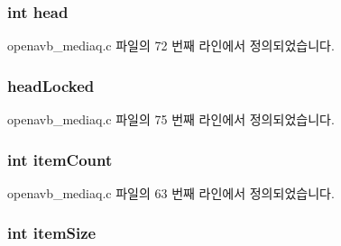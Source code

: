 \subsubsection[{\texorpdfstring{head}{head}}]{\setlength{\rightskip}{0pt plus 5cm}int head}\hypertarget{structmedia__q__info__t_a20358970b1abaf992eb85e071e454653}{}\label{structmedia__q__info__t_a20358970b1abaf992eb85e071e454653}


openavb\+\_\+mediaq.\+c 파일의 72 번째 라인에서 정의되었습니다.

\subsubsection[{\texorpdfstring{head\+Locked}{headLocked}}]{ head\+Locked}\hypertarget{structmedia__q__info__t_a6c67b0583525d5d6c4b9c53a67cd5780}{}\label{structmedia__q__info__t_a6c67b0583525d5d6c4b9c53a67cd5780}


openavb\+\_\+mediaq.\+c 파일의 75 번째 라인에서 정의되었습니다.

\subsubsection[{\texorpdfstring{item\+Count}{itemCount}}]{\setlength{\rightskip}{0pt plus 5cm}int item\+Count}\hypertarget{structmedia__q__info__t_a64154ed2427d248eb1d4aa28aef8daa2}{}\label{structmedia__q__info__t_a64154ed2427d248eb1d4aa28aef8daa2}


openavb\+\_\+mediaq.\+c 파일의 63 번째 라인에서 정의되었습니다.

\subsubsection[{\texorpdfstring{item\+Size}{itemSize}}]{\setlength{\rightskip}{0pt plus 5cm}int item\+Size}\hypertarget{structmedia__q__info__t_a42978dc635b477b2a80f5fa2741bb720}{}\label{structmedia__q__info__t_a42978dc635b477b2a80f5fa2741bb720}


